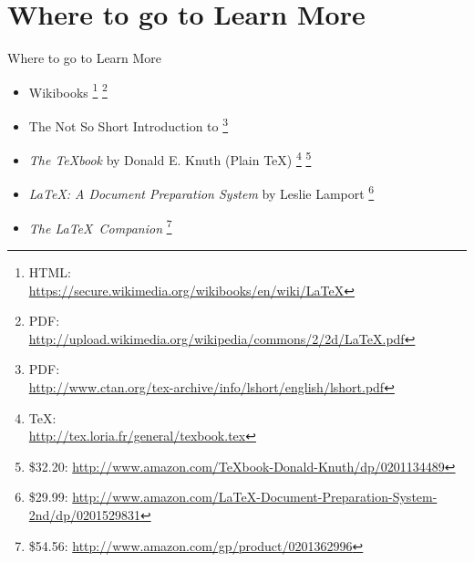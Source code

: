 \documentclass{beamer}                  %
\newcommand{\srule}{
	\rule{\textwidth}{1pt}\\
}
\newlength{\subsecwidth}
\newenvironment{slide}{
	\begin{frame} %
	\settowidth{\subsecwidth}{\insertsubsection} %
	\ifthenelse{\dimtest{\subsecwidth}{<}{1pt}}{ %
		\frametitle{\insertsection\\             %
		\vspace{-1ex}                            %
		\color{fore}\srule                       %
		\par                                     %
		\vspace{-3ex}                            %
		}
	}{                                           %
		\frametitle{\insertsection\ -- \insertsubsection\\ %
		\vspace{-1ex}                            %
		\color{fore}\srule                       %
		\par                                     %
		\vspace{-3ex}                            %
		}
	}
	\Large                                       %
}{
	\end{frame}
}
\newcommand{\titleslide}[1]{
	\section{#1}             %
	\begin{slide}
		\begin{center}
			\color{comments}
			\Huge            %
			#1               %
		\end{center}
	\end{slide}
}
\newcommand{\mediatitle}[1]{\textit{#1}}  %
\renewcommand{\thefootnote}{\fnsymbol{footnote}} %
\begin{document}
\renewcommand{\thefootnote}{\arabic{footnote}} %
\setcounter{footnote}{0}                       %
\titleslide{Where to go to Learn More}
\begin{slide}
	\begin{itemize}
		\normalsize
		\item Wikibooks
		\footnote{
			HTML:\\ \url{https://secure.wikimedia.org/wikibooks/en/wiki/LaTeX}
		}
		\footnote{
			PDF:\\ \url{http://upload.wikimedia.org/wikipedia/commons/2/2d/LaTeX.pdf}
		}
		\item The Not So Short Introduction to \LaTeXe
		\footnote{
			PDF:\\ \url{http://www.ctan.org/tex-archive/info/lshort/english/lshort.pdf}
		}
		\item \mediatitle{The \TeX book} by Donald E. Knuth (Plain \TeX)
		\footnote{
		 	\TeX:\\
			\url{http://tex.loria.fr/general/texbook.tex}
		}
		\footnote{
		 \$32.20:
			\url{http://www.amazon.com/TeXbook-Donald-Knuth/dp/0201134489}
		}
		\item \mediatitle{\LaTeX: A Document Preparation System} by Leslie Lamport
		\footnote{
		 \$29.99:
			\url{http://www.amazon.com/LaTeX-Document-Preparation-System-2nd/dp/0201529831}
		}
		\item \mediatitle{The \LaTeX\ Companion}
		\footnote{
		 \$54.56:
			\url{http://www.amazon.com/gp/product/0201362996}
		}
	\end{itemize}
\end{slide}
\end{document}
